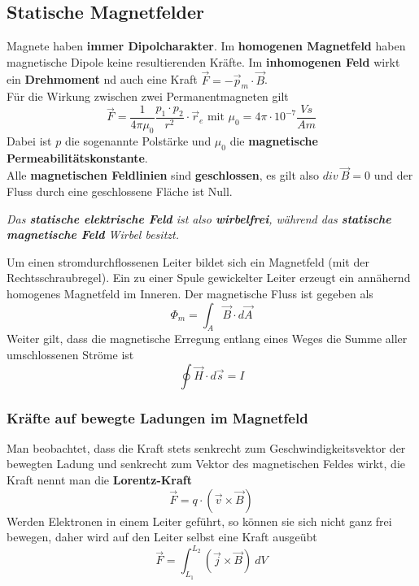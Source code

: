 \documentclass[12pt,a4paper,ngerman]{article}
\begin{document}
\subsection{Statische Magnetfelder}
Magnete haben \textbf{immer Dipolcharakter}. Im \textbf{homogenen Magnetfeld} haben magnetische Dipole keine resultierenden Kräfte. Im \textbf{inhomogenen Feld} wirkt ein \textbf{Drehmoment} nd auch eine Kraft $\vec{F} = -\vec{p}_m\cdot \vec{B}$. \\
Für die Wirkung zwischen zwei Permanentmagneten gilt
\begin{equation}
\vec{F} = \frac{1}{4 \pi \mu_0}\frac{p_1 \cdot p_2}{r^2}\cdot \vec{r}_e \text{ mit } \mu_0 = 4\pi \cdot 10^{-7} \frac{Vs}{Am}
\end{equation}
Dabei ist $p$ die sogenannte Polstärke und $\mu_0$ die \textbf{magnetische Permeabilitätskonstante}. \\
Alle \textbf{magnetischen Feldlinien} sind \textbf{geschlossen}, es gilt also $div \ \vec{B} = 0$ und der Fluss durch eine geschlossene Fläche ist Null. 
\begin{center}
\textit{Das \textbf{statische elektrische Feld} ist also \textbf{wirbelfrei}, während das \textbf{statische magnetische Feld} Wirbel besitzt.}
\end{center}
Um einen stromdurchflossenen Leiter bildet sich ein Magnetfeld (mit der Rechtsschraubregel). Ein zu einer Spule gewickelter Leiter erzeugt ein annähernd homogenes Magnetfeld im Inneren. Der magnetische Fluss ist gegeben als
\begin{equation}
\Phi_m = \int_{A}{\vec{B}\cdot d\vec{A}}
\end{equation}
Weiter gilt, dass die magnetische Erregung entlang eines Weges die Summe aller umschlossenen Ströme ist
\begin{equation}
\oint{\vec{H} \cdot d\vec{s}} = I
\end{equation}

\subsubsection*{Kräfte auf bewegte Ladungen im Magnetfeld}

Man beobachtet, dass die Kraft stets senkrecht zum Geschwindigkeitsvektor der bewegten Ladung und senkrecht zum Vektor des magnetischen Feldes wirkt, die Kraft nennt man die \textbf{Lorentz-Kraft}
\begin{equation}
\vec{F} = q\cdot (\vec{v} \times \vec{B})
\end{equation}
Werden Elektronen in einem Leiter geführt, so können sie sich nicht ganz frei bewegen, daher wird auf den Leiter selbst eine Kraft ausgeübt
\begin{equation}
\vec{F} = \int_{L_1}^{L_2}{(\vec{j} \times \vec{B}) \ dV}
\end{equation}
\end{document}
